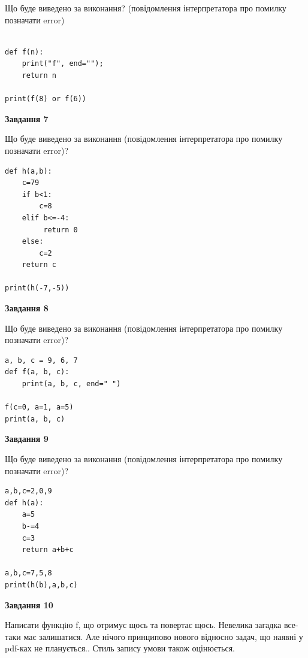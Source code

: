 \documentclass[12pt, ukrainian]{article}
\begin{document}
{\begin {large}
Що буде виведено за виконання? (повідомлення інтерпретатора про помилку позначати error)\par
\begin{verbatim}

def f(n):
    print("f", end="");
    return n

print(f(8) or f(6))
\end{verbatim}

{\begin {center}\textbf{Завдання 7}\end {center}}

Що буде виведено за виконання (повідомлення інтерпретатора про помилку позначати error)?\par
\begin{verbatim}
def h(a,b):
    c=79
    if b<1:
        c=8
    elif b<=-4:
         return 0
    else: 
        c=2
    return c

print(h(-7,-5))
\end{verbatim}

{\begin {center}\textbf{Завдання 8}\end {center}}

Що буде виведено за виконання (повідомлення інтерпретатора про помилку позначати error)?\par
\begin{verbatim}
a, b, c = 9, 6, 7
def f(a, b, c):
    print(a, b, c, end=" ")

f(c=0, a=1, a=5)
print(a, b, c)
\end{verbatim}

{\begin {center}\textbf{Завдання 9}\end {center}}

Що буде виведено за виконання (повідомлення інтерпретатора про помилку позначати error)?\par
\begin{verbatim}
a,b,c=2,0,9
def h(a):
    a=5
    b-=4
    c=3
    return a+b+c

a,b,c=7,5,8
print(h(b),a,b,c)
\end{verbatim}

{\begin {center}\textbf{Завдання 10}\end {center}}


Написати функцiю f, що отримує щось та повертає щось. Невелика загадка все-таки має залишатися. Але нічого принципово нового відносно задач, що наявні у pdf-ках не планується.. Стиль запису умови також оцінюється.\par
\end {large}}
\newpage
\end{document}
